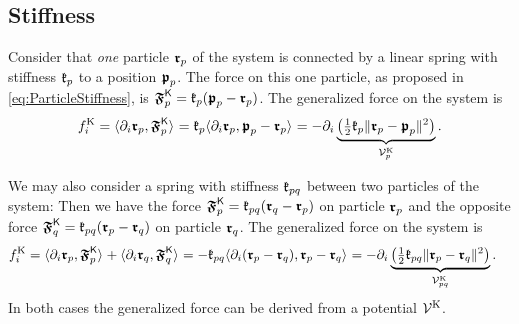 \subsection{Stiffness}\label{sec:ParticleSysStiffness}
Consider that \textit{one} particle $\boldsymbol{\mathfrak{r}}_{p}$ of the system is connected by a linear spring with stiffness $\mathfrak{k}_{p}$ to a position $\boldsymbol{\mathfrak{p}}_{p}$.
The force on this one particle, as proposed in \eqref{eq:ParticleStiffness}, is $\boldsymbol{\mathfrak{F}}_{p}^{\mathsf{K}} = \mathfrak{k}_{p} (\boldsymbol{\mathfrak{p}}_{p} - \boldsymbol{\mathfrak{r}}_{p})$.
The generalized force on the system is
\begin{align}
 f^{\mathrm{K}}_{i} 
 = \langle \partial_{i} \boldsymbol{\mathfrak{r}}_{p}, \boldsymbol{\mathfrak{F}}_{p}^{\mathsf{K}} \rangle_{} 
 = \mathfrak{k}_{p} \langle \partial_{i} \boldsymbol{\mathfrak{r}}_{p}, \boldsymbol{\mathfrak{p}}_{p} - \boldsymbol{\mathfrak{r}}_{p} \rangle_{}
 = -\partial_{i} \underbrace{\big( \tfrac{1}{2} \mathfrak{k}_{p} \| \boldsymbol{\mathfrak{r}}_{p} - \boldsymbol{\mathfrak{p}}_{p} \|_{}^2 \big)}_{\mathcal{V}^{\mathrm{K}}_{p}}.
\end{align}

We may also consider a spring with stiffness $\mathfrak{k}_{pq}$ between two particles of the system:
Then we have the force $\boldsymbol{\mathfrak{F}}_{p}^{\mathsf{K}} = \mathfrak{k}_{pq} (\boldsymbol{\mathfrak{r}}_{q} - \boldsymbol{\mathfrak{r}}_{p})$ on particle $\boldsymbol{\mathfrak{r}}_{p}$ and the opposite force $\boldsymbol{\mathfrak{F}}_{q}^{\mathsf{K}} = \mathfrak{k}_{pq} (\boldsymbol{\mathfrak{r}}_{p} - \boldsymbol{\mathfrak{r}}_{q})$ on particle $\boldsymbol{\mathfrak{r}}_{q}$.
The generalized force on the system is
\begin{align}
 f^{\mathrm{K}}_{i} &= \langle \partial_{i} \boldsymbol{\mathfrak{r}}_{p}, \boldsymbol{\mathfrak{F}}_{p}^{\mathsf{K}} \rangle_{} + \langle \partial_{i} \boldsymbol{\mathfrak{r}}_{q}, \boldsymbol{\mathfrak{F}}_{q}^{\mathsf{K}} \rangle_{} 
 = -\mathfrak{k}_{pq} \langle \partial_{i} (\boldsymbol{\mathfrak{r}}_{p} - \boldsymbol{\mathfrak{r}}_{q}), \boldsymbol{\mathfrak{r}}_{p} - \boldsymbol{\mathfrak{r}}_{q} \rangle_{}
 = -\partial_{i} \underbrace{\big( \tfrac{1}{2} \mathfrak{k}_{pq} \| \boldsymbol{\mathfrak{r}}_{p} - \boldsymbol{\mathfrak{r}}_{q} \|_{}^2 \big)}_{\mathcal{V}^{\mathrm{K}}_{pq}}.
\end{align}
In both cases the generalized force can be derived from a potential $\mathcal{V}^{\mathrm{K}}$.

